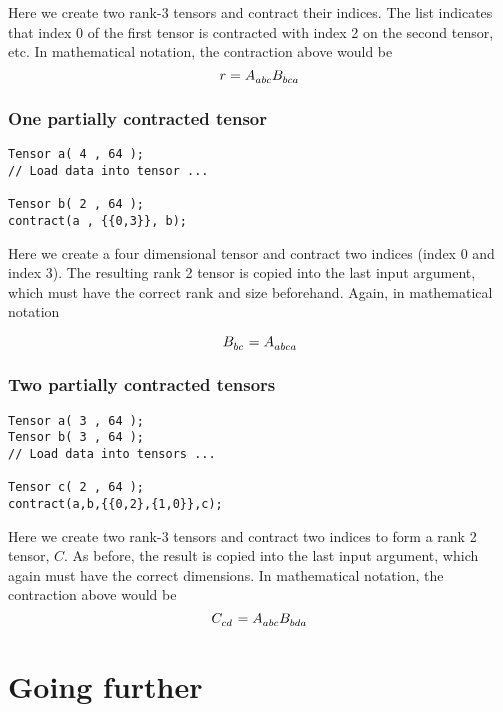 \documentclass[paper=a4, oneside]{memoir}
\newcommand{\tens}[2]{\tensor{#1}{#2}}
\begin{document}
Here we create two rank-3 tensors and contract their indices. The list 
indicates that index 0 of the first tensor is contracted with index 2 on the 
second tensor, etc. In mathematical notation, the contraction above would be
\begin{equation}
r = \tens{A}{_a_b_c} \tens{B}{_b_c_a} 
\end{equation}


\subsection*{One partially contracted tensor}

\begin{lstlisting}
Tensor a( 4 , 64 );
// Load data into tensor ...

Tensor b( 2 , 64 );
contract(a , {{0,3}}, b);
\end{lstlisting}

Here we create a four dimensional tensor and contract two indices (index 0 and 
index 3). The resulting rank 2 tensor is copied into the last input argument, 
which must have the correct rank and size beforehand. Again, in mathematical 
notation 

\begin{equation}
\tens{B}{_b_c} = \tens{A}{_a_b_c_a}
\end{equation}


\subsection*{Two partially contracted tensors}

\begin{lstlisting}
Tensor a( 3 , 64 );
Tensor b( 3 , 64 );
// Load data into tensors ...

Tensor c( 2 , 64 );
contract(a,b,{{0,2},{1,0}},c);
\end{lstlisting}

Here we create two rank-3 tensors and contract two indices to form a rank 2 
tensor, $C$. As before, the result is copied into the last input argument, 
which again must have the correct dimensions. In mathematical notation, the 
contraction above would be
\begin{equation}
\tens{C}{_c_d} = \tens{A}{_a_b_c} \tens{B}{_b_d_a} 
\end{equation}




\chapter{Going further}
\end{document}
